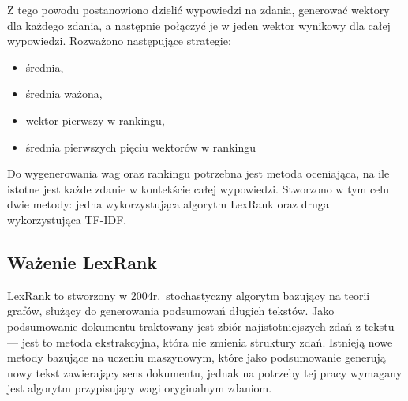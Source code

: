 	Z tego powodu postanowiono dzielić wypowiedzi na zdania, generować wektory dla każdego zdania, a następnie połączyć je w jeden wektor wynikowy dla całej wypowiedzi.
	Rozważono następujące strategie:
	\begin{itemize}
		\item średnia,
		\item średnia ważona,
		\item wektor pierwszy w rankingu,
		\item średnia pierwszych pięciu wektorów w rankingu
	\end{itemize}
	Do wygenerowania wag oraz rankingu potrzebna jest metoda oceniająca, na ile istotne jest każde zdanie w kontekście całej wypowiedzi.
	Stworzono w tym celu dwie metody: jedna wykorzystująca algorytm LexRank oraz druga wykorzystująca TF-IDF\@.

	\subsection{Ważenie LexRank}
		LexRank\cite{LexRank} to stworzony w 2004r.\ stochastyczny algorytm bazujący na teorii grafów, służący do generowania podsumowań długich tekstów.
		Jako podsumowanie dokumentu traktowany jest zbiór najistotniejszych zdań z tekstu --- jest to metoda ekstrakcyjna, która nie zmienia struktury zdań.
		Istnieją nowe metody bazujące na uczeniu maszynowym, które jako podsumowanie generują nowy tekst zawierający sens dokumentu\cite{abstractive_summ},
			jednak na potrzeby tej pracy wymagany jest algorytm przypisujący wagi oryginalnym zdaniom.
		
